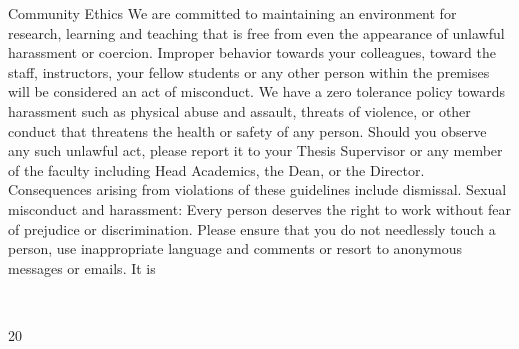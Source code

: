 \documentclass[a4paper,10pt]{article}
\begin{document}
Community Ethics
We are committed to maintaining an environment for research, learning and teaching that is
free from even the appearance of unlawful harassment or coercion. Improper behavior
towards your colleagues, toward the staff, instructors, your fellow students or any other
person within the premises will be considered an act of misconduct. We have a zero
tolerance policy towards harassment such as physical abuse and assault, threats of violence,
or other conduct that threatens the health or safety of any person. Should you observe any
such unlawful act, please report it to your Thesis Supervisor or any member of the faculty
including Head Academics, the Dean, or the Director. Consequences arising from violations
of these guidelines include dismissal.
Sexual misconduct and harassment: Every person deserves the right to work without fear
of prejudice or discrimination. Please ensure that you do not needlessly touch a person, use
inappropriate language and comments or resort to anonymous messages or emails. It is
	
  

20	
  
\end{document}
